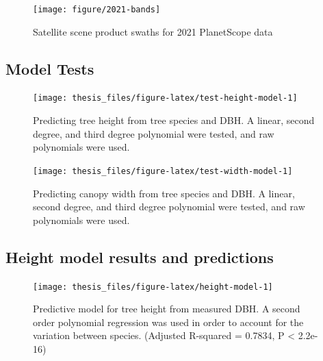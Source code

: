 \documentclass[12pt,twoside]{reedthesis}
\begin{document}
\begin{figure}[H]

{\centering \texttt{[image: figure/2021-bands]} 

}

\caption{Satellite scene product swaths for 2021 PlanetScope data}\label{fig:2021-swath}
\end{figure}
\hypertarget{model-tests}{%
\subsection*{Model Tests}\label{model-tests}}
\begin{figure}[H]

{\centering \texttt{[image: thesis\_files/figure-latex/test-height-model-1]} 

}

\caption[Model tests for tree height predictions]{Predicting tree height from tree species and DBH. A linear, second degree, and third degree polynomial were tested, and raw polynomials were used.}\label{fig:test-height-model}
\end{figure}
\begin{figure}[H]

{\centering \texttt{[image: thesis\_files/figure-latex/test-width-model-1]} 

}

\caption[Model tests for tree canopy width predictions]{Predicting canopy width from tree species and DBH. A linear, second degree, and third degree polynomial were tested, and raw polynomials were used.}\label{fig:test-width-model}
\end{figure}
\hypertarget{height-model-results-and-predictions}{%
\subsection*{Height model results and predictions}\label{height-model-results-and-predictions}}
\begin{figure}[H]

{\centering \texttt{[image: thesis\_files/figure-latex/height-model-1]} 

}

\caption[Tree height predictive model]{Predictive model for tree height from measured DBH. A second order polynomial regression was used in order to account for the variation between species. (Adjusted R-squared = 0.7834, P < 2.2e-16)}\label{fig:height-model}
\end{figure}
\end{document}
